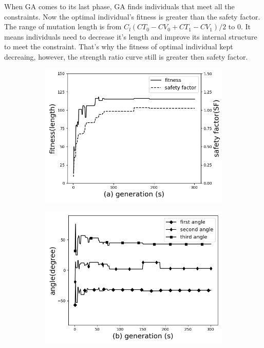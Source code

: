 When GA comes to its last phase, GA finds individuals that meet all the
constraints.  Now the optimal individual's fitness is greater than the safety
factor. The range of mutation length is from $C_l(CT_0 - CV_0 + CT_1 - CV_1)/2$
to 0. It means individuals need to decrease it's length and improve its internal
structure to meet the constraint. That's why the fitness of optimal individual
kept decreaing, however, the strength ratio curve still is greater then safety
factor.

\begin{figure}[!t]
	\centering
		\begin{subfigure}[b]{0.8\linewidth}
			\includegraphics[width=\linewidth]{2020-11-10-pre-image/Three_distinct_angles_fitness_and_sr.png}
		\end{subfigure}

		\begin{subfigure}[b]{0.8\linewidth}
			\includegraphics[width=\linewidth]{2020-11-10-pre-image/three_distinct_angles_angle_change.png}
		\end{subfigure}


\end{figure}
